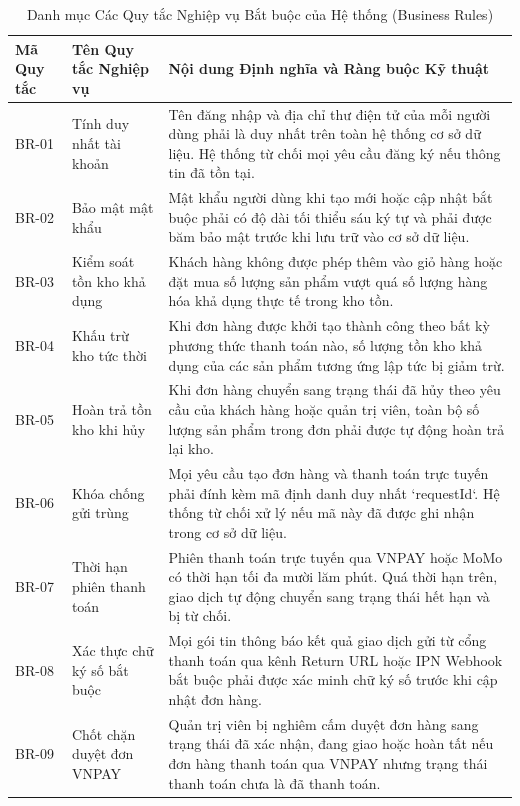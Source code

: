 \begin{table}[H]
\centering
\caption{Danh mục Các Quy tắc Nghiệp vụ Bắt buộc của Hệ thống (Business Rules)}
\label{tab:business_rules}
\begin{tabularx}{\textwidth}{p{2cm}p{3.8cm}X}
\toprule
\textbf{Mã Quy tắc} & \textbf{Tên Quy tắc Nghiệp vụ} & \textbf{Nội dung Định nghĩa và Ràng buộc Kỹ thuật} \\
\midrule
BR-01 & Tính duy nhất tài khoản & Tên đăng nhập và địa chỉ thư điện tử của mỗi người dùng phải là duy nhất trên toàn hệ thống cơ sở dữ liệu. Hệ thống từ chối mọi yêu cầu đăng ký nếu thông tin đã tồn tại. \\
\addlinespace
BR-02 & Bảo mật mật khẩu & Mật khẩu người dùng khi tạo mới hoặc cập nhật bắt buộc phải có độ dài tối thiểu sáu ký tự và phải được băm bảo mật trước khi lưu trữ vào cơ sở dữ liệu. \\
\addlinespace
BR-03 & Kiểm soát tồn kho khả dụng & Khách hàng không được phép thêm vào giỏ hàng hoặc đặt mua số lượng sản phẩm vượt quá số lượng hàng hóa khả dụng thực tế trong kho tồn. \\
\addlinespace
BR-04 & Khấu trừ kho tức thời & Khi đơn hàng được khởi tạo thành công theo bất kỳ phương thức thanh toán nào, số lượng tồn kho khả dụng của các sản phẩm tương ứng lập tức bị giảm trừ. \\
\addlinespace
BR-05 & Hoàn trả tồn kho khi hủy & Khi đơn hàng chuyển sang trạng thái đã hủy theo yêu cầu của khách hàng hoặc quản trị viên, toàn bộ số lượng sản phẩm trong đơn phải được tự động hoàn trả lại kho. \\
\addlinespace
BR-06 & Khóa chống gửi trùng & Mọi yêu cầu tạo đơn hàng và thanh toán trực tuyến phải đính kèm mã định danh duy nhất `requestId`. Hệ thống từ chối xử lý nếu mã này đã được ghi nhận trong cơ sở dữ liệu. \\
\addlinespace
BR-07 & Thời hạn phiên thanh toán & Phiên thanh toán trực tuyến qua VNPAY hoặc MoMo có thời hạn tối đa mười lăm phút. Quá thời hạn trên, giao dịch tự động chuyển sang trạng thái hết hạn và bị từ chối. \\
\addlinespace
BR-08 & Xác thực chữ ký số bắt buộc & Mọi gói tin thông báo kết quả giao dịch gửi từ cổng thanh toán qua kênh Return URL hoặc IPN Webhook bắt buộc phải được xác minh chữ ký số trước khi cập nhật đơn hàng. \\
\addlinespace
BR-09 & Chốt chặn duyệt đơn VNPAY & Quản trị viên bị nghiêm cấm duyệt đơn hàng sang trạng thái đã xác nhận, đang giao hoặc hoàn tất nếu đơn hàng thanh toán qua VNPAY nhưng trạng thái thanh toán chưa là đã thanh toán. \\

\end{tabularx}
\end{table}
